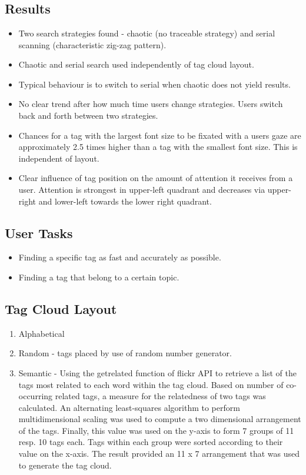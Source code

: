 \section{\cite{schrammel09b}}

\subsection{Results}
\begin{itemize}
	\item Two search strategies found - chaotic (no traceable strategy) and serial scanning (characteristic zig-zag pattern).
	\item Chaotic and serial search used independently of tag cloud layout.
	\item Typical behaviour is to switch to serial when chaotic does not yield results.
	\item No clear trend after how much time users change strategies. Users switch back and forth between two strategies.
	\item Chances for a tag with the largest font size to be fixated with a users gaze are approximately 2.5 times higher than a tag with the smallest font size. This is independent of layout.
	\item Clear influence of tag position on the amount of attention it receives from a user. Attention is strongest in upper-left quadrant and decreases via upper-right and lower-left towards the lower right quadrant.
\end{itemize}

\subsection{User Tasks}

\begin{itemize}
	\item Finding a specific tag as fast and accurately as possible.
	\item Finding a tag that belong to a certain topic.
\end{itemize}

\subsection{Tag Cloud Layout}

\begin{enumerate}
	\item Alphabetical
	\item Random - tags placed by use of random number generator.
	\item Semantic - Using the getrelated function of flickr API to retrieve a list of the tags most related to each word within the tag cloud. Based on number of co-occurring related tags, a measure for the relatedness of two
tags was calculated. An alternating least-squares algorithm to perform multidimensional scaling was used to compute a two dimensional arrangement of the tags. Finally, this value was used on the y-axis to form 7 groups of 11 resp. 10 tags each. Tags within each group were sorted according to their value on the x-axis. The result provided an 11 x 7 arrangement that was used to generate the tag cloud.
\end{enumerate}

